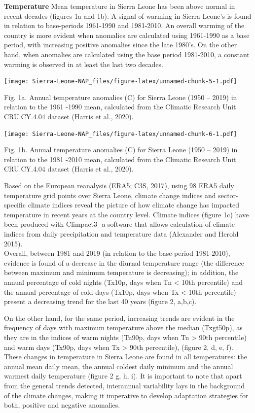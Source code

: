 \documentclass[
]{book}
\begin{document}
\textbf{Temperature }
Mean temperature in Sierra Leone has been above normal in recent decades (figures 1a and 1b). A signal of warming in Sierra Leone's is found in relation to base-periods 1961-1990 and 1981-2010. An overall warming of the country is more evident when anomalies are calculated using 1961-1990 as a base period, with increasing positive anomalies since the late 1980's. On the other hand, when anomalies are calculated using the base period 1981-2010, a constant warming is observed in at least the last two decades.

\texttt{[image: Sierra-Leone-NAP\_files/figure-latex/unnamed-chunk-5-1.pdf]}

Fig. 1a. Annual temperature anomalies (C) for Sierra Leone (1950 -- 2019) in relation to the 1961 -1990 mean, calculated from the Climatic Research Unit CRU.CY.4.04 dataset (Harris et al., 2020).

\texttt{[image: Sierra-Leone-NAP\_files/figure-latex/unnamed-chunk-6-1.pdf]}

Fig. 1b. Annual temperature anomalies (C) for Sierra Leone (1950 -- 2019) in relation to the 1981 -2010 mean, calculated from the Climatic Research Unit CRU.CY.4.04 dataset (Harris et al., 2020).

Based on the European reanalysis (ERA5; C3S, 2017), using 98 ERA5 daily temperature grid points over Sierra Leone, climate change indices and sector-specific climate indices reveal the picture of how climate change has impacted temperature in recent years at the country level. Climate indices (figure 1c) have been produced with Climpact3 -a software that allows calculation of climate indices from daily precipitation and temperature data (Alexander and Herold 2015).\\
Overall, between 1981 and 2019 (in relation to the base-period 1981-2010), evidence is found of a decrease in the diurnal temperature range (the difference between maximum and minimum temperature is decreasing); in addition, the annual percentage of cold nights (Tx10p, days when Tn \textless{} 10th percentile) and the annual percentage of cold days (Tx10p, days when Tx \textless{} 10th percentile) present a decreasing trend for the last 40 years (figure 2, a,b,c).

On the other hand, for the same period, increasing trends are evident in the frequency of days with maximum temperature above the median (Txgt50p), as they are in the indices of warm nights (Tn90p, days when Tn \textgreater{} 90th percentile) and warm days (Tx90p, days when Tx \textgreater{} 90th percentile), (figure 2, d, e, f). These changes in temperature in Sierra Leone are found in all temperatures: the annual mean daily mean, the annual coldest daily minimum and the annual warmest daily temperature (figure 2 g, h, i). It is important to note that apart from the general trends detected, interannual variability lays in the background of the climate changes, making it imperative to develop adaptation strategies for both, positive and negative anomalies.
\end{document}
